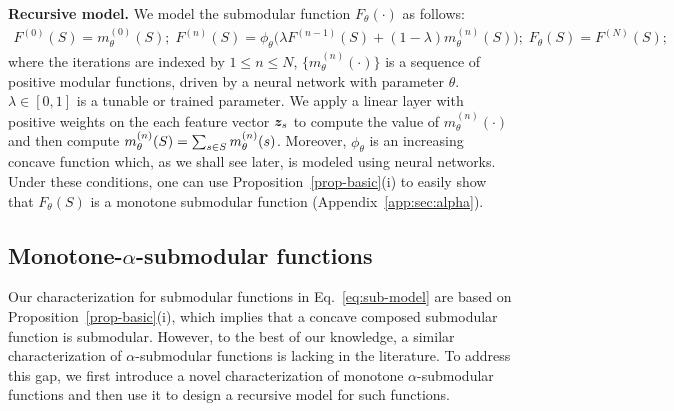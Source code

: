 \documentclass{article}
\newcommand{\xhdr}[1]{\noindent\textbf{#1.}}
\begin{document}
\xhdr{Recursive model}  We model the submodular function $F_{\theta}(\cdot)$ as follows:
\begin{align}
F^{(0)}(S) = m^{(0)} _{\theta}(S); \;
F^{(n)}(S) = \phi_{\theta}\big(\lambda  F^{(n-1)}(S)+  (1-\lambda)   m^{(n)} _{\theta}(S)\big); \;
F_{\theta}(S) = F^{(N)}(S);\label{eq:sub-model}
\end{align}
where the iterations are indexed by $1\le n\le N$, $\{m^{(n)}_{\theta}(\cdot)\}$ is   a sequence of positive modular functions, driven by a neural network with parameter $\theta$. $\lambda\in [0,1]$ is a tunable or trained parameter. We apply a linear layer with positive weights on the each feature vector $\bm{z}_{s}$ to compute the value of $m_{\theta} ^{(n)}(\cdot)$ and then compute $ m^{(n)} _{\theta}(S) = \sum_{s \in S} m^{(n)} _{\theta}(s)$.
Moreover, $\phi_{\theta}$ is an increasing concave function  which, as we shall see later, is modeled using neural networks. Under these conditions, one can  use Proposition~\ref{prop-basic}(i) to easily show that $F_{\theta}(S)$ is a monotone submodular function (Appendix~\ref{app:sec:alpha}).

\subsection{Monotone-$\alpha$-submodular functions}
\label{sec:alpha}

Our characterization for submodular functions in Eq.~\eqref{eq:sub-model} are based on  Proposition~\ref{prop-basic}(i), which implies that a concave composed submodular function is submodular.
 However, to the best of our knowledge, a similar characterization of $\alpha$-submodular functions
is lacking in the literature. 
To address this gap, we first introduce a novel characterization of monotone $\alpha$-submodular functions and then use it to design a recursive model for such functions. 
 
\end{document}
